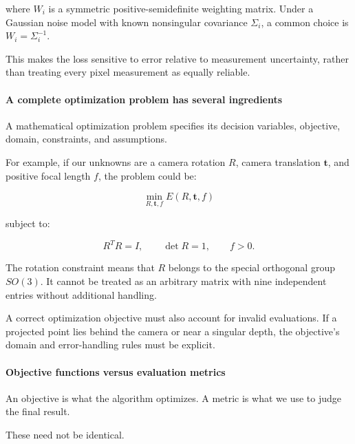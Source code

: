 where \(W_i\) is a symmetric positive-semidefinite weighting matrix. Under a Gaussian noise model with known nonsingular covariance \(\Sigma_i\), a common choice is \(W_i=\Sigma_i^{-1}\).

This makes the loss sensitive to error relative to measurement uncertainty, rather than treating every pixel measurement as equally reliable.

\paragraph{A complete optimization problem has several ingredients}\label{02-foundations-ii-ch026-a-complete-optimization-problem-has-several-ingredients}

\hypertarget{02-foundations-ii-ch026-a-complete-optimization-problem-has-several-ingredients}{}

A mathematical optimization problem specifies its decision variables, objective, domain, constraints, and assumptions.

For example, if our unknowns are a camera rotation \(R\), camera translation \(\mathbf t\), and positive focal length \(f\), the problem could be:

\[
\min_{R,\mathbf t,f}E(R,\mathbf t,f)
\]

subject to:

\[
R^TR=I,\qquad \det R=1,\qquad f>0.
\]

The rotation constraint means that \(R\) belongs to the special orthogonal group \(SO(3)\). It cannot be treated as an arbitrary matrix with nine independent entries without additional handling.

A correct optimization objective must also account for invalid evaluations. If a projected point lies behind the camera or near a singular depth, the objective's domain and error-handling rules must be explicit.

\paragraph{Objective functions versus evaluation metrics}\label{02-foundations-ii-ch026-objective-functions-versus-evaluation-metrics}

\hypertarget{02-foundations-ii-ch026-objective-functions-versus-evaluation-metrics}{}

An objective is what the algorithm optimizes. A metric is what we use to judge the final result.

These need not be identical.

